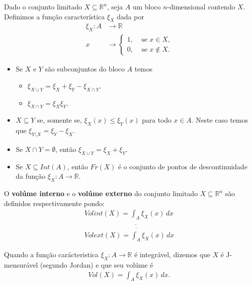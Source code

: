 \begin{definition}
  Dado o conjunto limitado $X\subseteq\mathbb{R}^{n}$, seja $A$ um bloco $n$-dimensional contendo $X$. Definimos a função característica $\xi_X$ dada por
  \begin{align*}
    \xi_{X}:A&\to\mathbb{R}\\
    x&\to\begin{cases}
      1, &\text{ se } x\in X \text{,} \\
      0, &\text{ se } x\notin X.
    \end{cases}
  \end{align*}
\end{definition}
\begin{proposition}[Propriedades]
\begin{itemize}
  \item Se $X$ e $Y$ são subconjuntos do bloco $A$ temos 
    \begin{itemize}
      \item $\xi_{X\cup Y}=\xi_{X}+\xi_{Y}-\xi_{X\cap  Y}$.
      \item $\xi_{X\cap Y}=\xi_{X}\xi_{Y}$.
    \end{itemize}
  \item $X\subseteq Y$ se, somente se, $\xi_{X}(x)\leq \xi_{Y}(x)$ para todo $x\in A$. Neste caso temos que $\xi_{Y\setminus X}=\xi_{Y}-\xi_{X}$.
  \item Se $X\cap Y=\emptyset$, então $\xi_{X\cup Y}=\xi_{X}+\xi_{Y}$.
  \item Se $X\subseteq Int(A)$, então $Fr(X)$ é o conjunto de pontos de descontinuidade da função $\xi_X:A\to\mathbb{R}$. 
\end{itemize}
\end{proposition}
\begin{definition}
  O \textbf{volúme interno} e o \textbf{volúme externo} do conjunto limitado $X\subseteq\mathbb{R}^{n}$ são definidos respectivamente pondo:
  \begin{align*}
    Volint(X)=\underline{\int_{A}}\xi_{X}(x)\,dx\\
    Volext(X)=\overline{\int_{A}}\xi_{X}(x)\,dx
  \end{align*}
\end{definition}
\begin{definition}
  Quando a função carácteristica $\xi_{X}:A\to\mathbb{R}$ é integrável, dizemos que $X$ é J-mensurável (segundo Jordan) e que seu volúme é
  \begin{align*}
    Vol(X)=\int_{A}\xi_{X}(x)\,dx.
  \end{align*}
\end{definition}
